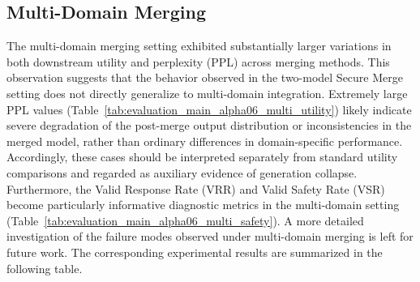 \documentclass{article}
\begin{document}

\subsection{Multi-Domain Merging}

The multi-domain merging setting exhibited substantially larger variations in both downstream utility and perplexity (PPL) across merging methods. This observation suggests that the behavior observed in the two-model Secure Merge setting does not directly generalize to multi-domain integration. Extremely large PPL values (Table~\ref{tab:evaluation_main_alpha06_multi_utility}) likely indicate severe degradation of the post-merge output distribution or inconsistencies in the merged model, rather than ordinary differences in domain-specific performance. Accordingly, these cases should be interpreted separately from standard utility comparisons and regarded as auxiliary evidence of generation collapse. Furthermore, the Valid Response Rate (VRR) and Valid Safety Rate (VSR) become particularly informative diagnostic metrics in the multi-domain setting (Table~\ref{tab:evaluation_main_alpha06_multi_safety}). A more detailed investigation of the failure modes observed under multi-domain merging is left for future work. The corresponding experimental results are summarized in the following table.
\end{document}
